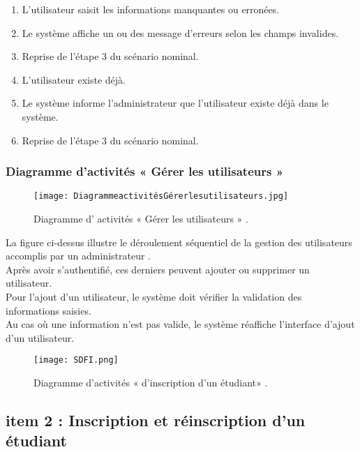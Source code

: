 \begin{itemize}
\begin{itemize}
		\begin{enumerate}
			\item L’utilisateur saisit les informations manquantes ou erronées.
			\item Le système affiche un ou des message d’erreurs selon les champs invalides.
			\item Reprise de l’étape 3 du scénario nominal.
			\item L’utilisateur existe déjà.
			\item Le système informe l’administrateur que l’utilisateur existe déjà dans le système.
			\item Reprise de l’étape 3 du scénario nominal.
		\end{enumerate}
	\end{itemize}
\end{itemize}	
\bigskip
\clearpage
\subsubsection{Diagramme d’activités « Gérer les utilisateurs » }
\begin{figure}[ht]
	\centering
	\texttt{[image: DiagrammeactivitésGérerlesutilisateurs.jpg]}
	\caption{Diagramme d' activités  « Gérer les utilisateurs »  .}
	\label{fig:Diagramme d' activités  Gérer les utilisateurs  }
\end{figure}
\FloatBarrier

La figure ci-dessus illustre le déroulement séquentiel de la gestion des utilisateurs accomplis par
un administrateur .\\
Après avoir s’authentifié, ces derniers peuvent ajouter ou supprimer un utilisateur.\\
Pour l’ajout d’un utilisateur, le système doit vérifier la validation des informations saisies.\\
 Au cas où une information n’est pas valide, le système réaffiche l’interface d’ajout d’un utilisateur.
 \begin{figure}[ht]
 	\centering
 	\texttt{[image: SDFI.png]}
 	\caption{Diagramme d'activités « d'inscription d'un étudiant» .}
 	\label{fig:Diagramme d' activités  d' inscription d'un étudiant   }
 \end{figure}
 \FloatBarrier
\clearpage
\subsection{item 2 : Inscription et réinscription d'un étudiant}
